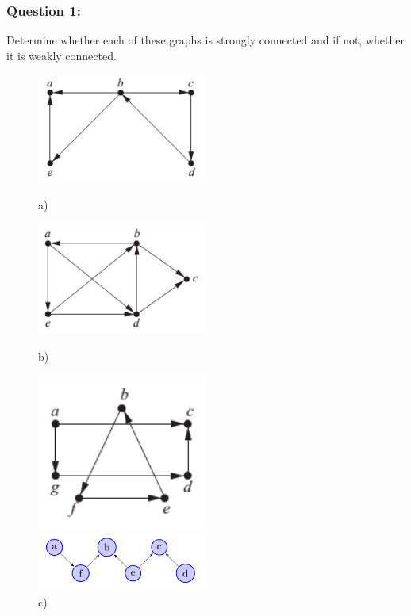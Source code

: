 \documentclass[a4paper]{article}
\begin{document}
	\subsubsection*{Question 1:}
	Determine whether each of these graphs is strongly connected and if not, whether it is weakly connected.
	\begin{figure}[H]
		\begin{minipage}{0.5\textwidth}
			\centering
			\includegraphics[width=0.5\textwidth]{tut91_1.png}
			\caption*{a)}
		\end{minipage}
		\begin{minipage}{0.5\textwidth}
			\centering
			\includegraphics[width=0.5\textwidth]{tut91_2.png}
			\caption*{b)}
		\end{minipage}
		\begin{minipage}{0.3\textwidth}
			\centering
			\includegraphics[width=0.5\textwidth]{tut91_3.png}
			\caption*{c)}
		\end{minipage}
		\begin{minipage}{0.3\textwidth}
			\centering
			\includegraphics[width=0.5\textwidth]{tut91_4.png}

\end{minipage}
\end{figure}
\end{document}
